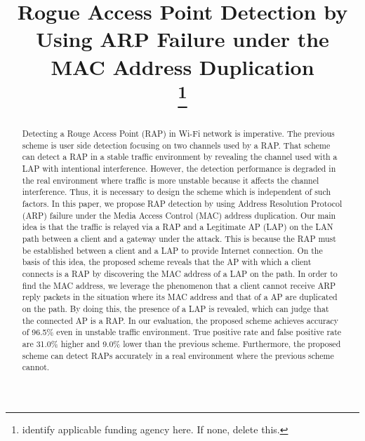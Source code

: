 \documentclass[conference]{IEEEtran}
\begin{document}
\title{Rogue Access Point Detection by Using ARP Failure under the MAC Address Duplication\\
\thanks{identify applicable funding agency here. If none, delete this.}
}

\author{

}
\maketitle
\begin{abstract}
Detecting a Rouge Access Point (RAP) in Wi-Fi network is imperative.
The previous scheme is user side detection focusing on two channels used by a RAP.
That scheme can detect a RAP in a stable traffic environment by revealing the channel used with a LAP with intentional interference.
However, the detection performance is degraded in the real environment where traffic is more unstable because it affects the channel interference.
Thus, it is necessary to design the scheme which is independent of such factors.
In this paper, we propose RAP detection by using Address Resolution Protocol (ARP) failure under the Media Access Control (MAC) address duplication.
Our main idea is that the traffic is relayed via a RAP and a Legitimate AP (LAP) on the LAN path between a client and a gateway under the attack.
This is because the RAP must be established between a client and a LAP to provide Internet connection.
On the basis of this idea, the proposed scheme reveals that the AP with which a client connects is a RAP by discovering the MAC address of a LAP on the path.
In order to find the MAC address, we leverage the phenomenon that a client cannot receive ARP reply packets in the situation where its MAC address and that of a AP are duplicated on the path.
By doing this, the presence of a LAP is revealed, which can judge that the connected AP is a RAP.
In our evaluation, the proposed scheme achieves accuracy of 96.5\% even in unstable traffic environment.
True positive rate and false positive rate are 31.0\% higher and 9.0\% lower than the previous scheme.
Furthermore, the proposed scheme can detect RAPs accurately in a real environment where the previous scheme cannot.
\end{abstract}
\end{document}
